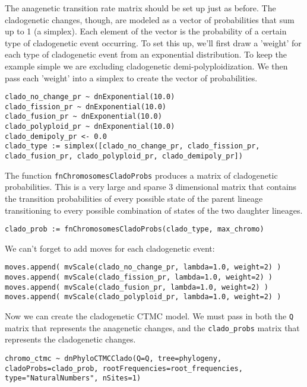 The anagenetic transition rate matrix should be set up just as before.
The cladogenetic changes, though, are modeled as a vector of probabilities 
that sum up to 1 (a simplex). Each element of the vector is the 
probability of a certain type of cladogenetic event occurring.
To set this up, we'll first draw a 'weight' for each type of 
cladogenetic event from an exponential distribution. To keep the
example simple we are excluding cladogenetic demi-polyploidization.
We then pass each 'weight' into a simplex to create the vector
of probabilities.
{\tt \begin{snugshade*}
\begin{lstlisting}
clado_no_change_pr ~ dnExponential(10.0)
clado_fission_pr ~ dnExponential(10.0)
clado_fusion_pr ~ dnExponential(10.0)
clado_polyploid_pr ~ dnExponential(10.0)
clado_demipoly_pr <- 0.0
clado_type := simplex([clado_no_change_pr, clado_fission_pr, clado_fusion_pr, clado_polyploid_pr, clado_demipoly_pr])
\end{lstlisting}
\end{snugshade*}}
The function \texttt{fnChromosomesCladoProbs} 
produces a matrix of cladogenetic probabilities. This is a very
large and sparse 3 dimensional matrix that contains the transition probabilities 
of every possible state of the parent lineage transitioning to every possible 
combination of states of the two daughter lineages.
{\tt \begin{snugshade*}
\begin{lstlisting}
clado_prob := fnChromosomesCladoProbs(clado_type, max_chromo)
\end{lstlisting}
\end{snugshade*}}
We can't forget to add moves for each cladogenetic event:
{\tt \begin{snugshade*}
\begin{lstlisting}
moves.append( mvScale(clado_no_change_pr, lambda=1.0, weight=2) )
moves.append( mvScale(clado_fission_pr, lambda=1.0, weight=2) )
moves.append( mvScale(clado_fusion_pr, lambda=1.0, weight=2) )
moves.append( mvScale(clado_polyploid_pr, lambda=1.0, weight=2) )
\end{lstlisting}
\end{snugshade*}}
Now we can create the cladogenetic CTMC model.
We must pass in both the \texttt{Q} matrix that represents the anagenetic changes,
and the \texttt{clado\_probs} matrix that represents the cladogenetic changes.
{\tt \begin{snugshade*}
\begin{lstlisting}
chromo_ctmc ~ dnPhyloCTMCClado(Q=Q, tree=phylogeny, cladoProbs=clado_prob, rootFrequencies=root_frequencies, type="NaturalNumbers", nSites=1)
\end{lstlisting}
\end{snugshade*}}
